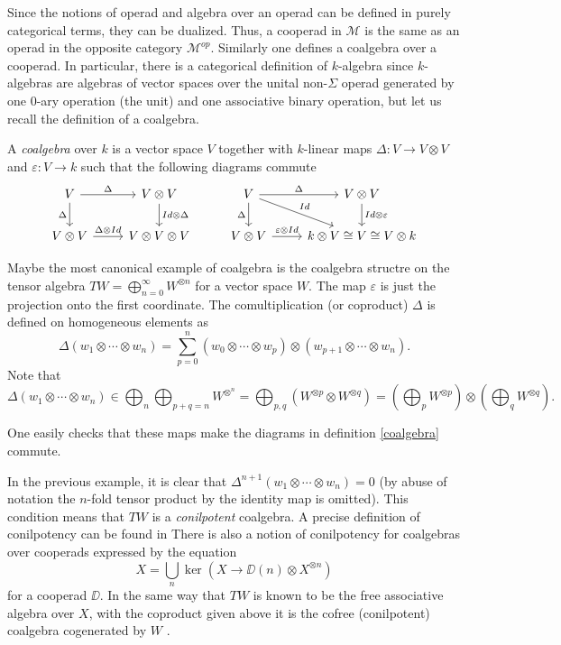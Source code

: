 \documentclass[TFM.tex]{subfiles}
\begin{document}
Since the notions of operad and algebra over an operad can be defined in purely categorical terms, they can be dualized. Thus, a cooperad in $\mathscr{M}$ is the same as an operad in the opposite category $\mathscr{M}^{op}$. Similarly one defines a coalgebra over a cooperad. In particular, there is a categorical definition of $k$-algebra since $k$-algebras are algebras of vector spaces over the unital non-$\Sigma$ operad generated by one 0-ary operation (the unit) and one associative binary operation, but let us recall the definition of a coalgebra.

\begin{defi}\label{coalgebra}
A \emph{coalgebra} over $k$ is a vector space $V$ together with $k$-linear maps $\Delta:V\to V\otimes V$ and $\varepsilon:V\to k$ such that the following diagrams commute
\[
\begin{tikzcd}
V \arrow[r, "\Delta"] \arrow[d, "\Delta"'] & V\otimes V \arrow[d, "Id\otimes\Delta"] & V \arrow[r, "\Delta"] \arrow[d, "\Delta"'] \arrow[rd, "Id"] & V\otimes V \arrow[d, "Id\otimes\varepsilon"] \\
V\otimes V \arrow[r, "\Delta\otimes Id"]   & V\otimes V\otimes V                     & V\otimes V \arrow[r, "\varepsilon\otimes Id"]               & k\otimes V\cong V\cong V\otimes k           
\end{tikzcd}
\]
\end{defi}

\begin{ex}\label{cofree}
Maybe the most canonical example of coalgebra is the coalgebra structre on the tensor algebra $TW=\bigoplus_{n=0}^\infty W^{\otimes n}$ for a vector space $W$. The map $\varepsilon$ is just the projection onto the first coordinate. The comultiplication (or coproduct) $\Delta$ is defined on homogeneous elements as
\[
\Delta(w_1\otimes\cdots\otimes w_n)=\sum_{p=0}^n(w_0\otimes\cdots \otimes w_p)\otimes (w_{p+1}\otimes\cdots\otimes w_n).
\]
Note that $$\Delta(w_1\otimes\cdots\otimes w_n)\in\bigoplus_n\bigoplus_{p+q=n}W^{\otimes^n}=\bigoplus_{p,q}\left(W^{\otimes p}\otimes W^{\otimes q}\right)=\left(\bigoplus_p W^{\otimes p}\right)\otimes \left(\bigoplus_q W^{\otimes q}\right).$$ 

One easily checks that these maps make the diagrams in definition \ref{coalgebra} commute.
\end{ex}

In the previous example, it is clear that $\Delta^{n+1}(w_1\otimes\cdots\otimes w_n)=0$ (by abuse of notation the $n$-fold tensor product by the identity map is omitted). This condition means that $TW$ is a \emph{conilpotent} coalgebra. A precise definition of conilpotency can be found in \cite[.4]{AlgebraicOperads} There is also a notion of conilpotency for coalgebras over cooperads expressed by the equation
\[
X=\bigcup_n\ker(X\to \DD(n)\otimes X^{\otimes n})
\]
for a cooperad $\DD$. In the same way that $TW$ is known to be the free associative algebra over $X$, with the coproduct given above it is the cofree (conilpotent) coalgebra cogenerated by $W$ \cite[Proposition 2.1 of .6]{AlgebraicOperads}.
\end{document}
